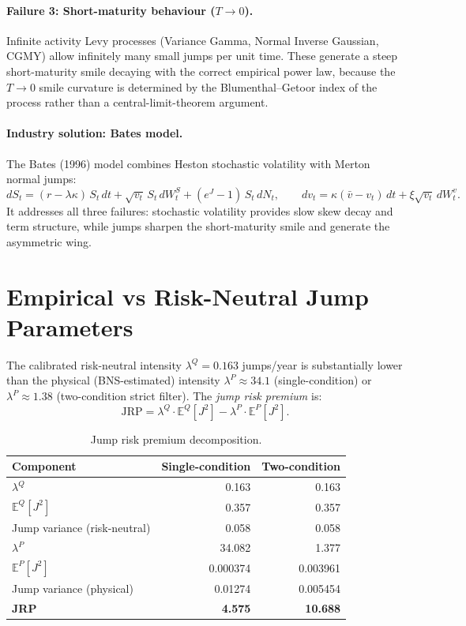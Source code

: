 \documentclass[12pt, a4paper]{article}
\begin{document}
\paragraph{Failure 3: Short-maturity behaviour ($T \to 0$).}
Infinite activity Levy processes (Variance Gamma, Normal Inverse Gaussian,
CGMY) allow infinitely many small jumps per unit time. These generate a steep
short-maturity smile decaying with the correct empirical power law, because
the $T \to 0$ smile curvature is determined by the Blumenthal--Getoor index
of the process rather than a central-limit-theorem argument.

\paragraph{Industry solution: Bates model.}
The Bates (1996) model combines Heston stochastic volatility with Merton
normal jumps:
\[
    dS_t = (r - \lambda\kappa)\,S_t\,dt
           + \sqrt{v_t}\,S_t\,dW_t^S
           + (e^J - 1)\,S_t\,dN_t, \qquad
    dv_t = \kappa(\bar{v}-v_t)\,dt + \xi\sqrt{v_t}\,dW_t^v.
\]
It addresses all three failures: stochastic volatility provides slow skew
decay and term structure, while jumps sharpen the short-maturity smile and
generate the asymmetric wing.

\section{Empirical vs Risk-Neutral Jump Parameters}

The calibrated risk-neutral intensity $\lambda^Q = 0.163$ jumps/year is
substantially lower than the physical (BNS-estimated) intensity
$\lambda^P \approx 34.1$ (single-condition) or $\lambda^P \approx 1.38$
(two-condition strict filter). The \emph{jump risk premium} is:
\[
    \text{JRP} = \lambda^Q \cdot \mathbb{E}^Q[J^2]
               - \lambda^P \cdot \mathbb{E}^P[J^2].
\]

\begin{table}[H]
\centering
\caption{Jump risk premium decomposition.}
\begin{tabular}{lrr}
\toprule
\textbf{Component} & \textbf{Single-condition} & \textbf{Two-condition} \\
\midrule
$\lambda^Q$                  & 0.163    & 0.163    \\
$\mathbb{E}^Q[J^2]$          & 0.357    & 0.357    \\
Jump variance (risk-neutral)  & 0.058    & 0.058    \\
$\lambda^P$                  & 34.082   & 1.377    \\
$\mathbb{E}^P[J^2]$          & 0.000374 & 0.003961 \\
Jump variance (physical)      & 0.01274  & 0.005454 \\
\textbf{JRP}                 & \textbf{4.575} & \textbf{10.688} \\
\bottomrule
\end{tabular}
\end{table}
\end{document}

